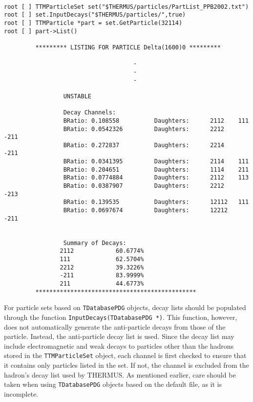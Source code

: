 \documentclass{elsarticle}
\begin{document}
\small
\begin{verbatim}

root [ ] TTMParticleSet set("$THERMUS/particles/PartList_PPB2002.txt")
root [ ] set.InputDecays("$THERMUS/particles/",true)
root [ ] TTMParticle *part = set.GetParticle(32114)
root [ ] part->List()

         ********* LISTING FOR PARTICLE Delta(1600)0 *********

                                     -
                                     -
                                     -

                 UNSTABLE

                 Decay Channels:
                 BRatio: 0.108558          Daughters:      2112    111
                 BRatio: 0.0542326         Daughters:      2212    -211
                 BRatio: 0.272837          Daughters:      2214    -211
                 BRatio: 0.0341395         Daughters:      2114    111
                 BRatio: 0.204651          Daughters:      1114    211
                 BRatio: 0.0774884         Daughters:      2112    113
                 BRatio: 0.0387907         Daughters:      2212    -213
                 BRatio: 0.139535          Daughters:      12112   111
                 BRatio: 0.0697674         Daughters:      12212   -211


                 Summary of Decays:
                2112            60.6774%
                111             62.5704%
                2212            39.3226%
                -211            83.9999%
                211             44.6773%
         **********************************************

\end{verbatim}
\normalsize

For particle sets based on \texttt{TDatabasePDG} objects, decay lists should be populated through the function 
\texttt{InputDecays(TDatabasePDG *)}. This function, however, does not automatically generate 
the anti-particle decays from those of the particle. Instead, the anti-particle decay list is used. 
Since the decay list may include electromagnetic and weak decays to particles other than the 
hadrons stored in the \texttt{TTMParticleSet} object, each channel is first checked to ensure that it 
contains only particles listed in the set. If not, the channel is excluded from the hadron's decay 
list used by THERMUS. As mentioned earlier, care should be taken when using \texttt{TDatabasePDG} objects 
based on the default file, as it is incomplete.\\ 
\end{document}

